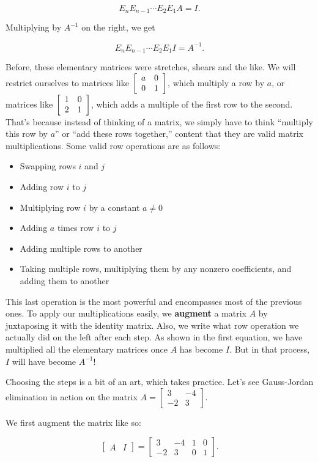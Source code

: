 \documentclass[../gatm.tex]{subfiles}
\begin{document}
$$E_nE_{n-1}\cdots E_2E_1A=I.$$

\noindent Multiplying by $A^{-1}$ on the right, we get

$$E_nE_{n-1}\cdots E_2E_1I=A^{-1}.$$

\noindent Before, these elementary matrices were stretches, shears and the like. We will restrict ourselves to matrices like $\left[\begin{array}{cc} a & 0 \\ 0 & 1 \end{array}\right]$, which multiply a row by $a$, or matrices like $\left[\begin{array}{cc} 1 & 0 \\ 2 & 1 \end{array}\right]$, which adds a multiple of the first row to the second. That's because instead of thinking of a matrix, we simply have to think ``multiply this row by $a$'' or ``add these rows together,'' content that they are valid matrix multiplications. Some valid row operations are as follows:

\begin{itemize}
\item Swapping rows $i$ and $j$
\item Adding row $i$ to $j$
\item Multiplying row $i$ by a constant $a\neq 0$
\item Adding $a$ times row $i$ to $j$
\item Adding multiple rows to another
\item Taking multiple rows, multiplying them by any nonzero coefficients, and adding them to another
\end{itemize}

\noindent This last operation is the most powerful and encompasses most of the previous ones. To apply our multiplications easily, we \textbf{augment} a matrix $A$ by juxtaposing it with the identity matrix. Also, we write what row operation we actually did on the left after each step. As shown in the first equation, we have multiplied all the elementary matrices once $A$ has become $I$. But in that process, $I$ will have become $A^{-1}$!

Choosing the steps is a bit of an art, which takes practice. Let's see Gauss-Jordan elimination in action on the matrix $A=\left[\begin{array}{cc}3 & -4 \\ -2 & 3\end{array}\right]$.

We first augment the matrix like so:

$$\left[\begin{array}{c|c}A & I \end{array}\right] = \left[\begin{array}{cc|cc} 3 & -4 & 1 & 0 \\ -2 & 3 & 0 & 1 \end{array}\right].$$
\end{document}
